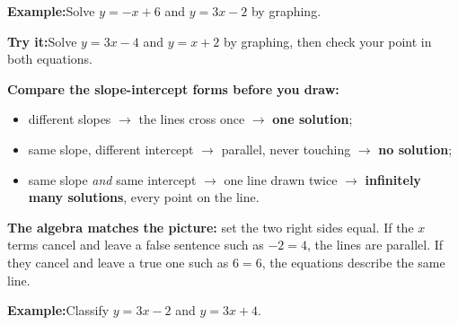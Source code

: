 \documentclass[12pt]{article}
\begin{document}
\begin{examplebox}
\textbf{Example:}\quad Solve $y = -x + 6$ and $y = 3x - 2$ by graphing.
\end{examplebox}

\begin{tryitbox}
\textbf{Try it:}\quad Solve $y = 3x - 4$ and $y = x + 2$ by graphing, then check
your point in both equations.\\[2pt]
\end{tryitbox}


\begin{formulabox}
\textbf{Compare the slope-intercept forms before you draw:}
\begin{itemize}[leftmargin=0.8cm, itemsep=0pt, topsep=1pt]
  \item different slopes $\rightarrow$ the lines cross once $\rightarrow$ \textbf{one solution};
  \item same slope, different intercept $\rightarrow$ parallel, never touching $\rightarrow$ \textbf{no solution};
  \item same slope \emph{and} same intercept $\rightarrow$ one line drawn twice $\rightarrow$ \textbf{infinitely many solutions}, every point on the line.
\end{itemize}
\textbf{The algebra matches the picture:} set the two right sides equal. If the
$x$ terms cancel and leave a false sentence such as $-2 = 4$, the lines are
parallel. If they cancel and leave a true one such as $6 = 6$, the equations
describe the same line.
\end{formulabox}

\begin{examplebox}
\textbf{Example:}\quad Classify $y = 3x - 2$ and $y = 3x + 4$.
\end{examplebox}
\end{document}
